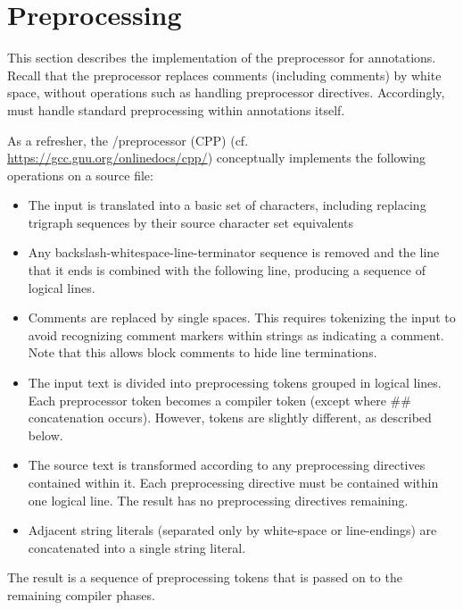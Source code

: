 \chapter{Preprocessing}
\label{sec:preprocessing}

This section describes the implementation of the \cpp preprocessor for \acslpp
annotations. Recall that the \cpp preprocessor replaces comments (including
\acslpp comments) by white space, without operations such as handling
preprocessor directives. Accordingly, \fclang must handle standard
preprocessing within \acslpp annotations itself.

As a refresher, the \C/\cpp preprocessor (CPP) (cf. \url{https://gcc.gnu.org/onlinedocs/cpp/}) conceptually implements the following operations on a \cpp source file:
\begin{itemize}
	\item The input is translated into a basic set of characters, including replacing trigraph sequences by their source character set equivalents
	\item Any backslash-whitespace-line-terminator sequence is removed and the line that it ends is combined with the following line, producing a sequence of logical lines.
	\item Comments are replaced by single spaces. This requires tokenizing the input to avoid recognizing comment markers within strings as indicating a comment. Note that this allows block comments to hide line terminations.
	\item The input text is divided into preprocessing tokens grouped in logical lines. Each preprocessor token becomes a compiler token (except where \#\# concatenation occurs). However, \acslb tokens are slightly different, as described below.
	\item The source text is transformed according to any preprocessing directives contained within it. 
	Each preprocessing directive must be contained within one logical line. The result has no preprocessing directives remaining.
    \item Adjacent string literals (separated only by white-space or line-endings) are concatenated into a single string literal.
	
\end{itemize}
The result is a sequence of preprocessing tokens that is passed on to the 
remaining compiler phases.

